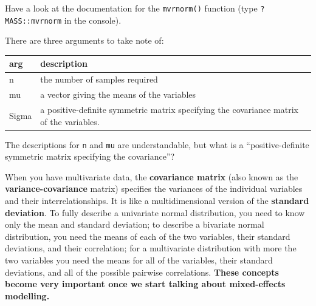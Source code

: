 \documentclass[]{book}
\begin{document}
Have a look at the documentation for the \texttt{mvrnorm()} function (type \texttt{?MASS::mvrnorm} in the console).

There are three arguments to take note of:

\begin{longtable}[]{@{}ll@{}}
\toprule
\begin{minipage}[b]{0.06\columnwidth}\raggedright
arg\strut
\end{minipage} & \begin{minipage}[b]{0.88\columnwidth}\raggedright
description\strut
\end{minipage}\tabularnewline
\midrule
\endhead
\begin{minipage}[t]{0.06\columnwidth}\raggedright
n\strut
\end{minipage} & \begin{minipage}[t]{0.88\columnwidth}\raggedright
the number of samples required\strut
\end{minipage}\tabularnewline
\begin{minipage}[t]{0.06\columnwidth}\raggedright
mu\strut
\end{minipage} & \begin{minipage}[t]{0.88\columnwidth}\raggedright
a vector giving the means of the variables\strut
\end{minipage}\tabularnewline
\begin{minipage}[t]{0.06\columnwidth}\raggedright
Sigma\strut
\end{minipage} & \begin{minipage}[t]{0.88\columnwidth}\raggedright
a positive-definite symmetric matrix specifying the covariance matrix of the variables.\strut
\end{minipage}\tabularnewline
\bottomrule
\end{longtable}

The descriptions for \texttt{n} and \texttt{mu} are understandable, but what is a ``positive-definite symmetric matrix specifying the covariance''?

When you have multivariate data, the \textbf{covariance matrix} (also known as the \textbf{variance-covariance} matrix) specifies the variances of the individual variables and their interrelationships. It is like a multidimensional version of the \textbf{standard deviation}. To fully describe a univariate normal distribution, you need to know only the mean and standard deviation; to describe a bivariate normal distribution, you need the means of each of the two variables, their standard deviations, and their correlation; for a multivariate distribution with more the two variables you need the means for all of the variables, their standard deviations, and all of the possible pairwise correlations. \textbf{These concepts become very important once we start talking about mixed-effects modelling.}
\end{document}
